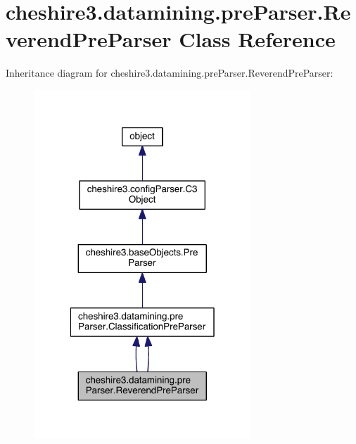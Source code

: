 \hypertarget{classcheshire3_1_1datamining_1_1pre_parser_1_1_reverend_pre_parser}{\section{cheshire3.\-datamining.\-pre\-Parser.\-Reverend\-Pre\-Parser Class Reference}
\label{classcheshire3_1_1datamining_1_1pre_parser_1_1_reverend_pre_parser}
}


Inheritance diagram for cheshire3.\-datamining.\-pre\-Parser.\-Reverend\-Pre\-Parser\-:
\nopagebreak
\begin{figure}[H]
\begin{center}
\leavevmode
\includegraphics[width=232pt]{classcheshire3_1_1datamining_1_1pre_parser_1_1_reverend_pre_parser__inherit__graph}
\end{center}
\end{figure}


